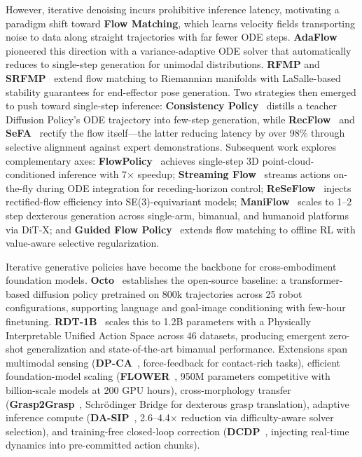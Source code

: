 \documentclass[acmsmall,screen,review,anonymous]{acmart}
\begin{document}
However, iterative denoising incurs prohibitive inference latency, motivating a paradigm shift toward \textbf{Flow Matching}, which learns velocity fields transporting noise to data along straight trajectories with far fewer ODE steps. \textbf{AdaFlow}~\cite{hu2024adaflow} pioneered this direction with a variance-adaptive ODE solver that automatically reduces to single-step generation for unimodal distributions. \textbf{RFMP} and \textbf{SRFMP}~\cite{braun2024riemannian, ding2025fast} extend flow matching to Riemannian manifolds with LaSalle-based stability guarantees for end-effector pose generation. Two strategies then emerged to push toward single-step inference: \textbf{Consistency Policy}~\cite{prasad2024consistency} distills a teacher Diffusion Policy's ODE trajectory into few-step generation, while \textbf{RecFlow}~\cite{xue2025recflow} and \textbf{SeFA}~\cite{sefa_policy_2024} rectify the flow itself---the latter reducing latency by over 98\% through selective alignment against expert demonstrations. Subsequent work explores complementary axes: \textbf{FlowPolicy}~\cite{zhang2025flowpolicy} achieves single-step 3D point-cloud-conditioned inference with 7$\times$ speedup; \textbf{Streaming Flow}~\cite{jiang2025streaming} streams actions on-the-fly during ODE integration for receding-horizon control; \textbf{ReSeFlow}~\cite{wang2025reseflow} injects rectified-flow efficiency into SE(3)-equivariant models; \textbf{ManiFlow}~\cite{yan2025maniflow} scales to 1--2 step dexterous generation across single-arm, bimanual, and humanoid platforms via DiT-X; and \textbf{Guided Flow Policy}~\cite{tiofack2026guided} extends flow matching to offline RL with value-aware selective regularization.

Iterative generative policies have become the backbone for cross-embodiment foundation models. \textbf{Octo}~\cite{octomodelteam2024} establishes the open-source baseline: a transformer-based diffusion policy pretrained on 800k trajectories across 25 robot configurations, supporting language and goal-image conditioning with few-hour finetuning. \textbf{RDT-1B}~\cite{rdt1b_2024} scales this to 1.2B parameters with a Physically Interpretable Unified Action Space across 46 datasets, producing emergent zero-shot generalization and state-of-the-art bimanual performance. Extensions span multimodal sensing (\textbf{DP-CA}~\cite{kang2025dpca}, force-feedback for contact-rich tasks), efficient foundation-model scaling (\textbf{FLOWER}~\cite{reuss2025flower}, 950M parameters competitive with billion-scale models at 200 GPU hours), cross-morphology transfer (\textbf{Grasp2Grasp}~\cite{zhong2025grasp2grasp}, Schr\"{o}dinger Bridge for dexterous grasp translation), adaptive inference compute (\textbf{DA-SIP}~\cite{chun2025dynamictesttimecomputescaling}, 2.6--4.4$\times$ reduction via difficulty-aware solver selection), and training-free closed-loop correction (\textbf{DCDP}~\cite{wu2026dcdp}, injecting real-time dynamics into pre-committed action chunks).\@
\end{document}
